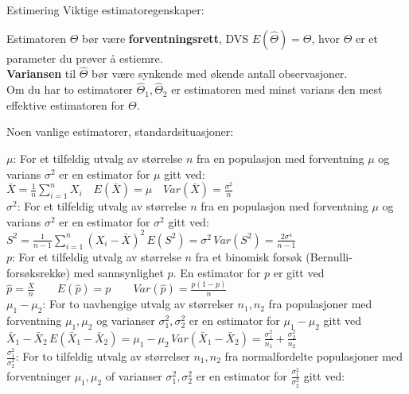 \documentclass[final,hyperref={pdfpagelabels=false}]{beamer}
\begin{document}
\begin{frame}{} 
	\begin{columns}[t]
		\begin{column}{.25\linewidth}
			\begin{block}{\center\normalsize Estimering}
				\center\normalsize Viktige estimatoregenskaper:\\
				{\footnotesize\raggedright
					Estimatoren $\hat\Theta$ bør være \textbf{forventningsrett}, DVS $E(\hat\Theta)=\Theta$, hvor $\Theta$ er et parameter du prøver å estiemre. \\
					\textbf{Variansen} til $\hat\Theta$ bør være synkende med økende antall observasjoner.\\
					Om du har to estimatorer $\hat\Theta_1, \hat\Theta_2$ er estimatoren med minst varians den mest effektive estimatoren for $\Theta$.
				}
				\center\normalsize Noen vanlige estimatorer, standardsituasjoner:\\
				{\footnotesize\raggedright
					$\mu$: For et tilfeldig utvalg av størrelse $n$ fra en populasjon med forventning $\mu$ og varians $\sigma^2$ er en estimator for $\mu$ gitt ved: \\
					$\bar X=\frac{1}{n}\sum_{i=1}^nX_i\quad E(\bar X)=\mu\quad Var(\bar X)=\frac{\sigma^2}{n}$\\
					$\sigma^2$: For et tilfeldig utvalg av størrelse $n$ fra en populasjon med forventning $\mu$ og varians $\sigma^2$ er en estimator for $\sigma^2$ gitt ved: \\
					$S^2=\frac{1}{n-1}\sum_{i=1}^n(X_i-\bar X)^2\,E(S^2)=\sigma^2\,Var(S^2)=\frac{2\sigma^4}{n-1}$\\
					$p$: For et tilfeldig utvalg av størrelse $n$ fra et binomisk forsøk (Bernulli-forsøksrekke) med sannsynlighet $p$. En estimator for $p$ er gitt ved\\
					$\hat p=\frac{X}{n}\qquad E(\hat p)=p\qquad Var(\hat p)=\frac{p(1-p)}{n}$\\
					$\mu_1-\mu_2$: For to uavhengige utvalg av størrelser $n_1,n_2$ fra populasjoner med forventning $\mu_1,\mu_2$ og varianser $\sigma_1^2,\sigma_2^2$ er en estimator for $\mu_1-\mu_2$ gitt ved \\
					$\bar X_1 - \bar X_2 \, E(\bar X_1 - \bar X_2)=\mu_1-\mu_2\,Var(\bar X_1 - \bar X_2)=\frac{\sigma_1^2}{n_1}+\frac{\sigma_2^2}{n_2}$\\
					$\frac{\sigma_1^2}{\sigma_2^2}$: For to tilfeldig utvalg av størrelser $n_1,n_2$ fra normalfordelte populasjoner med forventninger $\mu_1,\mu_2$ of varianser $\sigma_1^2,\sigma_2^2$ er en estimator for $\frac{\sigma_1^2}{\sigma_2^2}$ gitt ved:
}
\end{block}
\end{column}
\end{columns}
\end{frame}
\end{document}
